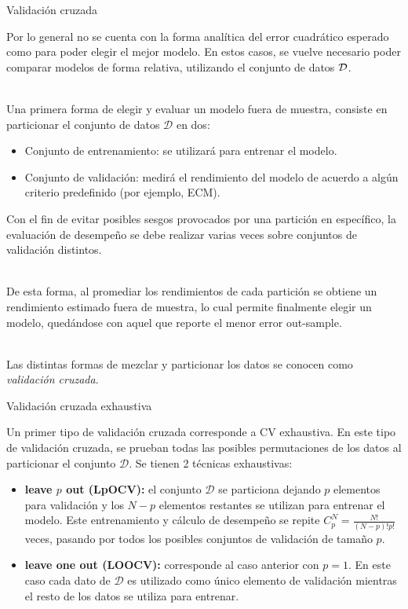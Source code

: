 \documentclass[9pt, handout]{beamer}
\begin{document}
\begin{frame}{Validación cruzada}

Por lo general no se cuenta con la forma analítica del error cuadrático esperado como para poder elegir el mejor modelo. En estos casos, se vuelve necesario poder comparar modelos de forma relativa, utilizando el conjunto de datos ${\mathcal D}$.\\~\ \pause

Una primera forma de elegir y evaluar un modelo fuera de muestra, consiste en particionar el conjunto de datos $\mathcal{D}$ en dos:

\begin{itemize}
	\item Conjunto de entrenamiento: se utilizará para entrenar el modelo.\pause
	\item Conjunto de validación: medirá el rendimiento del modelo de acuerdo a algún criterio predefinido (por ejemplo, ECM).\pause
\end{itemize}

Con el fin de evitar posibles sesgos provocados por una partición en específico, la evaluación de desempeño se debe realizar varias veces sobre conjuntos de validación distintos.\\~\ \pause

De esta forma, al promediar los rendimientos de cada partición se obtiene un rendimiento estimado fuera de muestra, lo cual permite finalmente elegir un modelo, quedándose con aquel que reporte el menor error out-sample.\\~\ \pause

Las distintas formas de mezclar y particionar los datos se conocen como \emph{validación cruzada}.
	
\end{frame}


\begin{frame}{Validación cruzada exhaustiva}

Un primer tipo de validación cruzada corresponde a CV exhaustiva. En este tipo de validación cruzada, se prueban todas las posibles permutaciones de los datos al particionar el conjunto $\mathcal{D}$. \pause Se tienen 2 técnicas exhaustivas:

\begin{itemize}
	\item \textbf{leave $p$ out (LpOCV):} el conjunto $\mathcal{D}$ se particiona dejando $p$ elementos para validación y los $N-p$ elementos restantes se utilizan para entrenar el modelo. Este entrenamiento y cálculo de desempeño se repite $C_p^N=\frac{N!}{(N-p)!p!}$ veces, pasando por todos los posibles conjuntos de validación de tamaño $p$. \pause
	\item \textbf{leave one out (LOOCV):} corresponde al caso anterior con $p=1$. En este caso cada dato de $\mathcal{D}$ es utilizado como único elemento de validación mientras el resto de los datos se utiliza para entrenar.
\end{itemize}

\end{frame}
\end{document}
